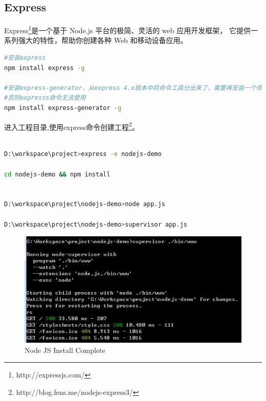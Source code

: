 \documentclass{book}
\begin{document}
\subsection{Express}

Express\footnote{http://expressjs.com/}是一个基于 Node.js 平台的极简、灵活的 web 应用开发框架，
它提供一系列强大的特性，帮助你创建各种 Web 和移动设备应用。 

\begin{lstlisting}[language=Bash]
#安装express
npm install express -g

#安装express-generator，从express 4.x版本中将命令工具分出来了，需要再安装一个命令工具
#否则expresss命令无法使用
npm install express-generator -g 
\end{lstlisting}

进入工程目录,使用express命令创建工程\footnote{http://blog.fens.me/nodejs-express3/}。

\begin{lstlisting}[language=Bash]

D:\workspace\project>express -e nodejs-demo

cd nodejs-demo && npm install


D:\workspace\project\nodejs-demo>node app.js

D:\workspace\project\nodejs-demo>supervisor app.js

\end{lstlisting}


\begin{figure}[htbp]
	\centering
	\includegraphics[scale=1]{StartTemplateProject.jpg}
	\caption{Node JS Install Complete}
	\label{fig:StartTemplateProject}
\end{figure}
\end{document}

